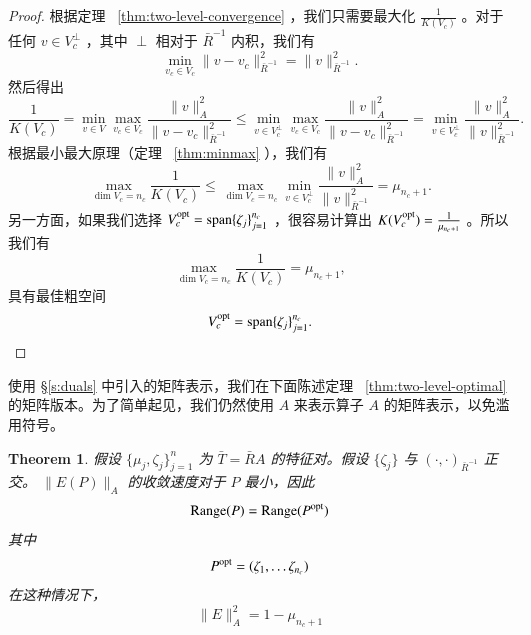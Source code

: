 \documentclass[12pt]{acta_2011xz}
\newtheorem{theorem}{Theorem}[section]
\begin{document}
   \begin{proof}根据定理~    \ref{thm:two-level-convergence}    ，我们只需要最大化    $\frac{1}{K(V_c)}$    。对于任何    $v\in V_c^{\perp}$    ，其中    $\perp$    相对于    $\bar{R}^{-1}$    内积，我们有
   \begin{equation}
\min_{v_c\in V_c}\|v-v_c\|^2_{\bar R^{-1}} = \|v\|^2_{\bar{R}^{-1}}.
\end{equation}    然后得出
   \begin{equation*}
    \frac{1}{K(V_c)}=\min_{v\in V}\max_{v_c\in V_c}\frac{\|v\|^2_A}{\|v-v_c\|_{\bar R^{-1}}^2}\le \min_{v\in V_c^{\perp}}\max_{v_c\in V_c}\frac{\|v\|_A^2}{\|v-v_c\|_{\bar R^{-1}}^2}=\min_{v\in V_c^{\perp}}\frac{\|v\|_A^2}{\|v\|_{\bar R^{-1}}^2}.
\end{equation*}    根据最小最大原理（定理~    \ref{thm:minmax}    ），我们有
   \begin{equation*}
    \max_{\dim V_c=n_c}\frac{1}{K(V_c)}\le\max_{\dim V_c=n_c}\min_{v\in V_c^{\perp}}\frac{\|v\|_A^2}{\|v\|_{\bar R^{-1}}^2}=\mu_{n_c+1}.
\end{equation*}    另一方面，如果我们选择    $V_c^{\rm opt}=\operatorname{span} \{ \zeta_j \} _{j=1}^{n_c}$    ，很容易计算出    $K(V_c^{\rm opt})=\frac{1}{\mu_{n_c+1}}$    。所以我们有
   \begin{equation*}
    \max_{\dim V_c=n_c}\frac{1}{K(V_c)}=\mu_{n_c+1},
\end{equation*}    具有最佳粗空间
   \begin{equation*}
    V_c^{\rm opt}= \operatorname{span} \{ \zeta_j \} _{j=1}^{n_c}.
\end{equation*}     \end{proof}     


   


 
 
 
 
 
   

使用    \S       \ref{s:duals}    中引入的矩阵表示，我们在下面陈述定理~    \ref{thm:two-level-optimal}    的矩阵版本。为了简单起见，我们仍然使用    $A$    来表示算子    $A$    的矩阵表示，以免滥用符号。
   \begin{theorem}假设    $ \{ \mu_j, \zeta_j \} _{j=1}^{n}$    为
   $\bar T = \bar{R} {A}$    的特征对。假设    $ \{ \zeta_j \} $    与    $(\cdot, \cdot)_{\bar R^{-1}}$    正交。   $\|E(P)\|_{A}$    的收敛速度对于    $P$    最小，因此 
   \begin{equation}
    \operatorname{Range}(P)=    \operatorname{Range}(P^{\rm opt})
    \end{equation}    其中
   \begin{equation}
      \label{optP}
P^{\rm opt}=(\zeta_1,\ldots\zeta_{n_c})
\end{equation}    在这种情况下，
   \begin{equation}
\|E\|_A^2=1-\mu_{n_c+1}  
\end{equation}     \end{theorem}     
\end{document}
